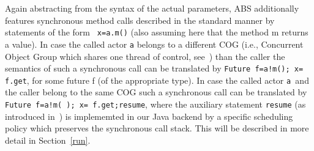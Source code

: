 Again abstracting from the syntax of the actual parameters,
ABS additionally features synchronous method calls described in the standard manner
by statements of the form \lstinline| x=a.m()| (also assuming here that the method m returns a value). In case the called actor \lstinline|a| belongs to a different 
COG (i.e., Concurrent Object Group which shares one thread of control, see~\cite{abs})
than the caller the semantics of such a synchronous call can be translated
by \lstinline|Future f=a!m(); x= f.get|, for some future f (of the appropriate type).
In case the called actor \lstinline|a |and the caller belong to the same COG such a synchronous call can be translated by \lstinline|Future f=a!m( ); x= f.get;resume|,
where the auxiliary statement \lstinline|resume| (as introduced in~\cite{resume})
is implememted in our Java backend by a specific scheduling policy which preserves the synchronous call stack.
This will be described in more detail in Section~\ref{run}.




